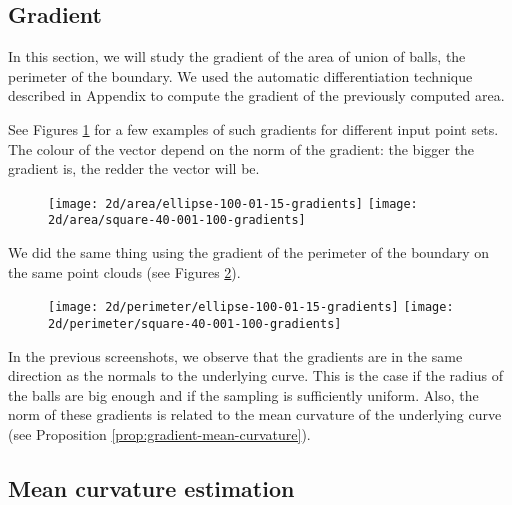 \subsection{Gradient}

In this section, we will study the gradient of the area of union of balls, the
perimeter of the boundary. We used the automatic differentiation technique
described in Appendix  to compute the gradient of the
previously computed area.

See Figures \ref{fig:gradients_area_2d} for a few examples of such gradients
for different input point sets. The colour of the vector depend on the norm of
the gradient: the bigger the gradient is, the redder the vector will be.

\begin{figure}[h]
    \centering

    \texttt{[image: 2d/area/ellipse-100-01-15-gradients]}
    \texttt{[image: 2d/area/square-40-001-100-gradients]}
    \label{fig:gradients_area_2d}
\end{figure}

We did the same thing using the gradient of the perimeter of the boundary on the
same point clouds (see Figures \ref{fig:gradients_perimeter_2d}).

\begin{figure}[h]
    \centering
    \texttt{[image: 2d/perimeter/ellipse-100-01-15-gradients]}
    \texttt{[image: 2d/perimeter/square-40-001-100-gradients]}

    \label{fig:gradients_perimeter_2d}
\end{figure}

In the previous screenshots, we observe that the gradients are in the same
direction as the normals to the underlying curve. This is the case if the radius
of the balls are big enough and if the sampling is sufficiently uniform. Also,
the norm of these gradients is related to the mean curvature of the underlying
curve (see Proposition \ref{prop:gradient-mean-curvature}).

\subsection{Mean curvature estimation}

